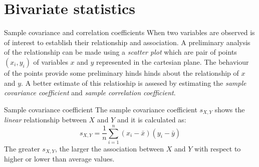 \documentclass[8pt]{beamer}
\begin{document}
\section{Bivariate statistics}
\begin{frame}{Sample covariance and correlation coefficients}
    When two variables are observed  is of interest to establish their relationship and association. A preliminary analysis of the relationship can be made using a \emph{scatter plot} which are pair of points $(x_i, y_i)$ of variables $x$ and $y$ represented in the cartesian plane. The behaviour of the points provide some preliminary hinds hinds about the relationship of $x$ and $y$. A better estimate of this relatioship is assesed by estimating the \emph{sample covariance coefficient} and \emph{sample correlation coefficient}.

    \begin{block}{Sample covariance coefficient}
        The sample covariance coefficient $s_{X,Y}$ shows the \emph{linear} relationship between $X$ and $Y$ and it is calculated as:
        $$
        s_{X,Y} = \frac{1}{n} \sum_{i=1}^{n} \left(x_i - \bar{x}\right)\left(y_i - \bar{y}\right)
        $$
        The greater $s_{X,Y}$, the larger the association between $X$ and $Y$ with respect to higher or lower than average values. 
   \end{block}

\end{frame}
\end{document}
